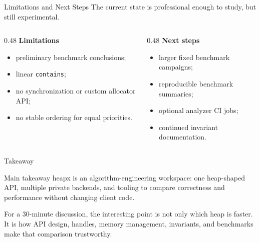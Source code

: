 \documentclass[10pt,aspectratio=43]{beamer}
\begin{document}
\begin{frame}{Limitations and Next Steps}
    The current state is professional enough to study, but still experimental.

    \vspace{0.4em}
    \begin{columns}[T,onlytextwidth]
        \begin{column}{0.48\textwidth}
            \textbf{Limitations}
            \begin{itemize}
                \item preliminary benchmark conclusions;
                \item linear \texttt{contains};
                \item no synchronization or custom allocator API;
                \item no stable ordering for equal priorities.
            \end{itemize}
        \end{column}
        \begin{column}{0.48\textwidth}
            \textbf{Next steps}
            \begin{itemize}
                \item larger fixed benchmark campaigns;
                \item reproducible benchmark summaries;
                \item optional analyzer CI jobs;
                \item continued invariant documentation.
            \end{itemize}
        \end{column}
    \end{columns}
\end{frame}

\begin{frame}{Takeaway}
    \begin{block}{Main takeaway}
        heapx is an algorithm-engineering workspace: one heap-shaped API, multiple private backends, and tooling to compare correctness and performance without changing client code.
    \end{block}

    \vspace{0.7em}
    For a 30-minute discussion, the interesting point is not only which heap is faster.
    It is how API design, handles, memory management, invariants, and benchmarks make that comparison trustworthy.
\end{frame}
\end{document}
